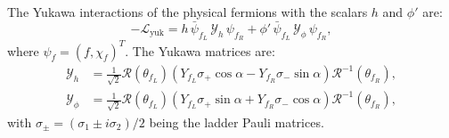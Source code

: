 The Yukawa interactions of the physical fermions with the scalars $h$ and $\phi'$ are:
\begin{equation}
    -\mathcal{L}_{\text{yuk}} = h \, \bar{\psi}_{f_L} \, \mathcal{Y}_{h} \, \psi_{f_R} + \phi' \, \bar{\psi}_{f_L} \, \mathcal{Y}_{\phi} \, \psi_{f_R},
\end{equation}
where $\psi_f = (f, \chi_f)^T$. The Yukawa matrices are:
\begin{align}
    \mathcal{Y}_{h} &= \frac{1}{\sqrt{2}} \mathcal{R}(\theta_{f_L}) \left( Y_{f_L} \sigma_+ \cos\alpha - Y_{f_R} \sigma_- \sin\alpha \right) \mathcal{R}^{-1}(\theta_{f_R}), \label{eq:YukawaL} \\
    \mathcal{Y}_{\phi} &= \frac{1}{\sqrt{2}} \mathcal{R}(\theta_{f_L}) \left( Y_{f_L} \sigma_+ \sin\alpha + Y_{f_R} \sigma_- \cos\alpha \right) \mathcal{R}^{-1}(\theta_{f_R}), \label{eq:YukawaR}
\end{align}
with $\sigma_{\pm} = (\sigma_1 \pm i \sigma_2)/2$ being the ladder Pauli matrices.

